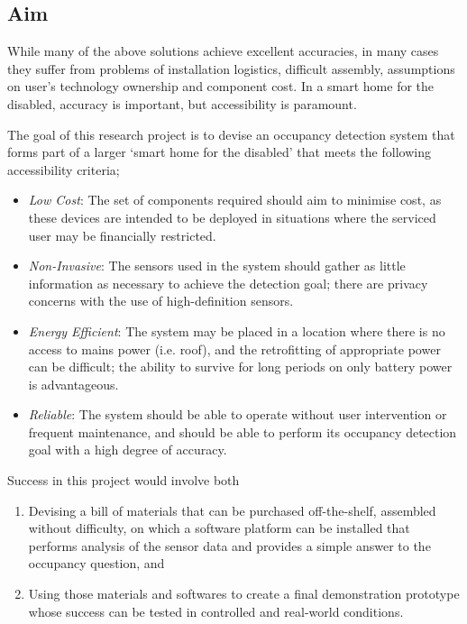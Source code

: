 \documentclass[../thesis/thesis.tex]{subfiles}
\begin{document}
\begin{bibunit}
\section{Aim}

While many of the above solutions achieve excellent accuracies, in many cases they suffer from problems of installation logistics, difficult assembly, assumptions on user's technology ownership and component cost. In a smart home for the disabled, accuracy is important, but accessibility is paramount.

The goal of this research project is to devise an occupancy detection system that forms part of a larger `smart home for the disabled' that meets the following accessibility criteria;

\begin{itemize}
 \item \emph{Low Cost}: The set of components required should aim to minimise cost, as these devices are intended to be deployed in situations where the serviced user may be financially restricted.
 
 \item \emph{Non-Invasive}: The sensors used in the system should gather as little information as necessary to achieve the detection goal; there are privacy concerns with the use of high-definition sensors.
 
 \item \emph{Energy Efficient}: The system may be placed in a location where there is no access to mains power (i.e. roof), and the retrofitting of appropriate power can be difficult; the ability to survive for long periods on only battery power is advantageous.
 
 \item \emph{Reliable}: The system should be able to operate without user intervention or frequent maintenance, and should be able to perform its occupancy detection goal with a high degree of accuracy.
\end{itemize}

Success in this project would involve both
\begin{enumerate}
 \item Devising a bill of materials that can be purchased off-the-shelf, assembled without difficulty, on which a software platform can be installed that performs analysis of the sensor data and provides a simple answer to the occupancy question, and
 \item Using those materials and softwares to create a final demonstration prototype whose success can be tested in controlled and real-world conditions.
\end{enumerate}


\end{bibunit}
\end{document}
